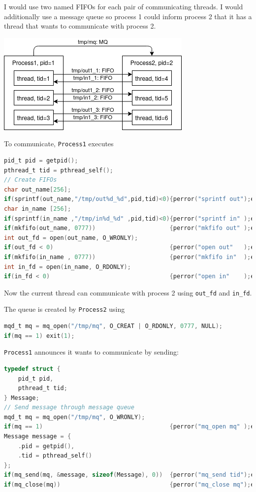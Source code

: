 \documentclass{sope}
\begin{document}
I would use two named FIFOs for each pair of communicating threads. I would additionally use a message queue so process 1 could inform process 2 that it has a thread that wants to communicate with process 2.
\begin{center}
    \includegraphics[scale=0.5]{2017N_07_a}
\end{center}

To communicate, \texttt{Process1} executes
\begin{lstlisting}[language=C,basicstyle=\ttfamily\small]
pid_t pid = getpid();
pthread_t tid = pthread_self();
// Create FIFOs
char out_name[256];
if(sprintf(out_name,"/tmp/out%d_%d",pid,tid)<0){perror("sprintf out");exit(1);}
char in_name [256];
if(sprintf(in_name ,"/tmp/in%d_%d" ,pid,tid)<0){perror("sprintf in" );exit(1);}
if(mkfifo(out_name, 0777))                     {perror("mkfifo out" );exit(1);}
int out_fd = open(out_name, O_WRONLY);
if(out_fd < 0)                                 {perror("open out"   );exit(1);}
if(mkfifo(in_name , 0777))                     {perror("mkfifo in"  );exit(1);}
int in_fd = open(in_name, O_RDONLY);
if(in_fd < 0)                                  {perror("open in"    );exit(1);}
\end{lstlisting}
Now the current thread can communicate with process 2 using \texttt{out\_fd} and \texttt{in\_fd}.

The queue is created by \texttt{Process2} using
\begin{lstlisting}[language=C,basicstyle=\ttfamily\small]
mqd_t mq = mq_open("/tmp/mq", O_CREAT | O_RDONLY, 0777, NULL);
if(mq == 1) exit(1);
\end{lstlisting}
\texttt{Process1} announces it wants to communicate by sending:
\begin{lstlisting}[language=C,basicstyle=\ttfamily\small]
typedef struct {
    pid_t pid,
    pthread_t tid;
} Message;
// Send message through message queue
mqd_t mq = mq_open("/tmp/mq", O_WRONLY);
if(mq == 1)                                    {perror("mq_open mq" );exit(1);}
Message message = {
    .pid = getpid(),
    .tid = pthread_self()
};
if(mq_send(mq, &message, sizeof(Message), 0))  {perror("mq_send tid");exit(1);}
if(mq_close(mq))                               {perror("mq_close mq");exit(1);}
\end{lstlisting}
\end{document}

